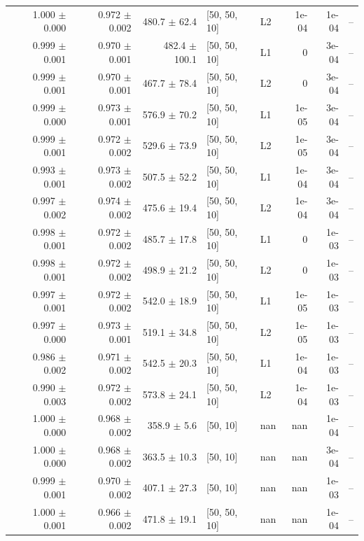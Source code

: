 \documentclass[reprint,english,notitlepage, floatfix]{revtex4-2}  %
\begin{document}
\begin{longtable}{r r r l l r r l}
\rowcolor{Cluster2} 1.000 $\pm$ 0.000 & 0.972 $\pm$ 0.002 & 480.7 $\pm$ 62.4 & [50, 50, 10] & L2 & 1e-04 & 1e-04 & -- \\
\rowcolor{Cluster2} 0.999 $\pm$ 0.001 & 0.970 $\pm$ 0.001 & 482.4 $\pm$ 100.1 & [50, 50, 10] & L1 & 0 & 3e-04 & -- \\
\rowcolor{Cluster2} 0.999 $\pm$ 0.001 & 0.970 $\pm$ 0.001 & 467.7 $\pm$ 78.4 & [50, 50, 10] & L2 & 0 & 3e-04 & -- \\
\rowcolor{Cluster2} 0.999 $\pm$ 0.000 & 0.973 $\pm$ 0.001 & 576.9 $\pm$ 70.2 & [50, 50, 10] & L1 & 1e-05 & 3e-04 & -- \\
\rowcolor{Cluster2} 0.999 $\pm$ 0.001 & 0.972 $\pm$ 0.002 & 529.6 $\pm$ 73.9 & [50, 50, 10] & L2 & 1e-05 & 3e-04 & -- \\
\rowcolor{Cluster2} 0.993 $\pm$ 0.001 & 0.973 $\pm$ 0.002 & 507.5 $\pm$ 52.2 & [50, 50, 10] & L1 & 1e-04 & 3e-04 & -- \\
\rowcolor{Cluster2} 0.997 $\pm$ 0.002 & 0.974 $\pm$ 0.002 & 475.6 $\pm$ 19.4 & [50, 50, 10] & L2 & 1e-04 & 3e-04 & -- \\
\rowcolor{Cluster2} 0.998 $\pm$ 0.001 & 0.972 $\pm$ 0.002 & 485.7 $\pm$ 17.8 & [50, 50, 10] & L1 & 0 & 1e-03 & -- \\
\rowcolor{Cluster2} 0.998 $\pm$ 0.001 & 0.972 $\pm$ 0.002 & 498.9 $\pm$ 21.2 & [50, 50, 10] & L2 & 0 & 1e-03 & -- \\
\rowcolor{Cluster2} 0.997 $\pm$ 0.001 & 0.972 $\pm$ 0.002 & 542.0 $\pm$ 18.9 & [50, 50, 10] & L1 & 1e-05 & 1e-03 & -- \\
\rowcolor{Cluster2} 0.997 $\pm$ 0.000 & 0.973 $\pm$ 0.001 & 519.1 $\pm$ 34.8 & [50, 50, 10] & L2 & 1e-05 & 1e-03 & -- \\
\rowcolor{Cluster2} 0.986 $\pm$ 0.002 & 0.971 $\pm$ 0.002 & 542.5 $\pm$ 20.3 & [50, 50, 10] & L1 & 1e-04 & 1e-03 & -- \\
\rowcolor{Cluster2} 0.990 $\pm$ 0.003 & 0.972 $\pm$ 0.002 & 573.8 $\pm$ 24.1 & [50, 50, 10] & L2 & 1e-04 & 1e-03 & -- \\
\rowcolor{Cluster2} 1.000 $\pm$ 0.000 & 0.968 $\pm$ 0.002 & 358.9 $\pm$ 5.6 & [50, 10] & nan & nan & 1e-04 & -- \\
\rowcolor{Cluster2} 1.000 $\pm$ 0.000 & 0.968 $\pm$ 0.002 & 363.5 $\pm$ 10.3 & [50, 10] & nan & nan & 3e-04 & -- \\
\rowcolor{Cluster2} 0.999 $\pm$ 0.001 & 0.970 $\pm$ 0.002 & 407.1 $\pm$ 27.3 & [50, 10] & nan & nan & 1e-03 & -- \\
\rowcolor{Cluster2} 1.000 $\pm$ 0.001 & 0.966 $\pm$ 0.002 & 471.8 $\pm$ 19.1 & [50, 50, 10] & nan & nan & 1e-04 & -- \\

\end{longtable}
\end{document}
